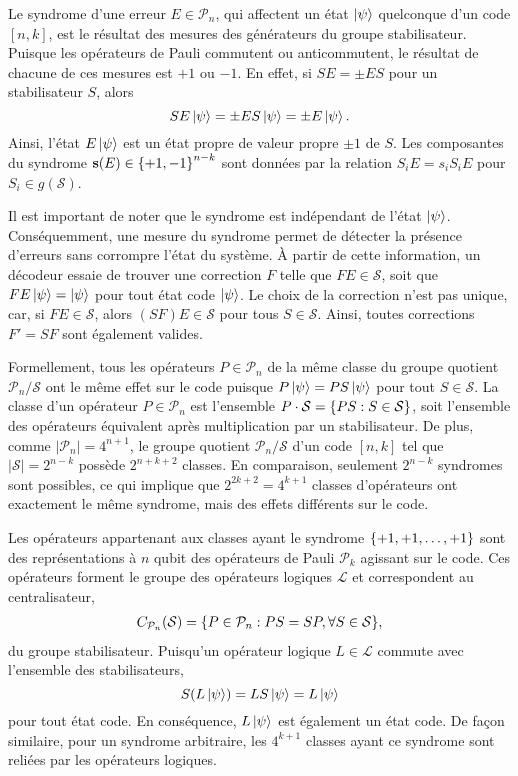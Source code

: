 Le syndrome d'une erreur $E \in \mathcal P_n$,
qui affectent un état $\ket\psi$ quelconque d'un code $[n, k]$,
est le résultat des mesures des générateurs du groupe stabilisateur.
Puisque les opérateurs de Pauli commutent ou anticommutent,
le résultat de chacune de ces mesures est $+1$ ou $-1$.
En effet, si $SE = \pm ES$ pour un stabilisateur $S$,
alors
\begin{equation}
  SE\ket\psi = \pm E S \ket\psi = \pm E\ket\psi.
\end{equation}
Ainsi,
l'état $E\ket\psi$ est un état propre de valeur propre $\pm 1$ de $S$.
Les composantes du syndrome $\vb{s}(E) \in \qty{+1, -1}^{n - k}$
sont données par la relation $S_iE = s_i S_i E$ pour $S_i \in g(\mathcal S)$.

Il est important de noter que le syndrome est indépendant de l'état $\ket \psi$.
Conséquemment,
une mesure du syndrome permet de détecter la présence d'erreurs sans corrompre l'état du système.
À partir de cette information,
un décodeur essaie de trouver une correction $F$ telle que $FE \in \mathcal S$, 
soit que $FE\ket\psi = \ket\psi$ pour tout état code $\ket\psi$.
Le choix de la correction n'est pas unique, car, si $FE \in \mathcal S$,
alors $(SF)E \in \mathcal S$ pour tous $S \in \mathcal S$.
Ainsi,
toutes corrections $F' = SF$ sont également valides.

Formellement,
tous les opérateurs $P \in \mathcal P_n$ de la même classe du groupe quotient $\mathcal P_n/\mathcal S$
ont le même effet sur le code puisque $P\ket\psi = PS\ket\psi$ pour tout $S \in \mathcal S$.
La classe d'un opérateur $P \in \mathcal P_n$ est l'ensemble $P\cdot \mathcal S = \qty{PS : S\in \mathcal S}$,
soit l'ensemble des opérateurs équivalent après multiplication par un stabilisateur.
De plus,
comme $|\mathcal P_n| = 4^{n+1}$,
le groupe quotient $\mathcal P_n/\mathcal S$ d'un code $[n, k]$ tel que $|\mathcal S| = 2^{n - k}$
possède $2^{n+k+2}$ classes.
En comparaison,
seulement $2^{n-k}$ syndromes sont possibles,
ce qui implique que $2^{2k + 2} = 4^{k + 1}$ classes d'opérateurs ont exactement le même syndrome,
mais des effets différents sur le code.

Les opérateurs appartenant aux classes ayant le syndrome $\qty{+1, +1, \ldots, +1}$
sont des représentations à $n$ qubit des opérateurs de Pauli $\mathcal P_k$
agissant sur le code.
Ces opérateurs forment le groupe des opérateurs logiques $\mathcal L$ et correspondent
au centralisateur,
\begin{align}
  C_{\mathcal P_n}(\mathcal S) 
  = \qty{P \in \mathcal P_n : PS = SP, \forall S \in \mathcal S},
\end{align}
du groupe stabilisateur.
Puisqu'un opérateur logique $L \in \mathcal L$ commute avec l'ensemble des stabilisateurs,
\begin{equation}
  S(L\ket\psi) = LS\ket\psi = L\ket\psi
\end{equation}
pour tout état code.
En conséquence,
$L\ket\psi$ est également un état code.
De façon similaire,
pour un syndrome arbitraire,
les $4^{k+1}$ classes ayant ce syndrome sont reliées par les opérateurs logiques.

